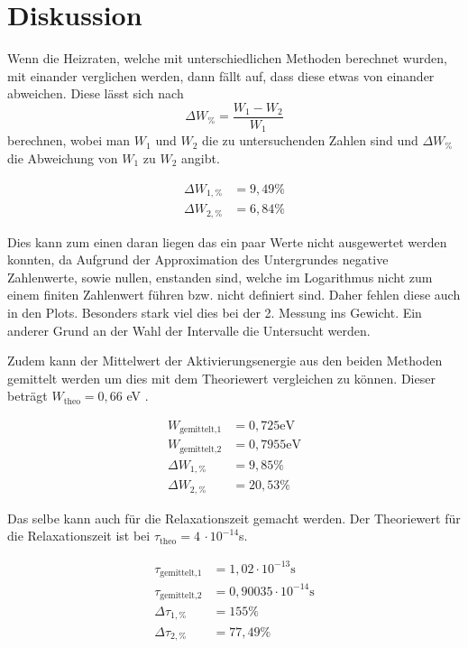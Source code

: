 \section{Diskussion}
\label{sec:Diskussion}

Wenn die Heizraten, welche mit unterschiedlichen Methoden berechnet wurden, mit einander verglichen werden, dann fällt auf, dass diese etwas von einander abweichen. Diese lässt sich 
nach 
\begin{equation*}
    \Delta W_{\%} = \frac{W_1-W_2}{W_1}
\end{equation*}
\noindent
berechnen, wobei man $W_1$ und $W_2$ die zu untersuchenden Zahlen sind und $\Delta W_{\%}$ die Abweichung von $W_1$ zu $W_2$ angibt.

\begin{align*}
    \Delta W_{1,\%} &=  9,49\%   \\
    \Delta W_{2,\%} &=  6,84\%
  \end{align*}

Dies kann zum einen daran liegen das ein paar Werte nicht ausgewertet werden konnten, da Aufgrund der Approximation des Untergrundes negative Zahlenwerte, sowie nullen, enstanden sind, welche
im Logarithmus nicht zum einem finiten Zahlenwert führen bzw. nicht definiert sind. Daher fehlen diese auch in den Plots. Besonders stark viel dies bei der 2. Messung ins Gewicht.
Ein anderer Grund an der Wahl der Intervalle die Untersucht werden.

\noindent
Zudem kann der Mittelwert der Aktivierungsenergie aus den beiden Methoden gemittelt werden um dies mit dem Theoriewert vergleichen zu können. Dieser beträgt $W_\text{theo} = 0,66$ eV \cite{muccillo}.

\begin{align*}
    W_\text{gemittelt,1} &= 0,725  \si{\electronvolt}\\
    W_\text{gemittelt,2} &= 0,7955 \si{\electronvolt}\\
    \Delta W_{1,\%} &=  9,85\%   \\
    \Delta W_{2,\%} &=  20,53\%
  \end{align*}

\noindent
Das selbe kann auch für die Relaxationszeit gemacht werden. Der Theoriewert für die Relaxationszeit ist bei $\tau_\text{theo} = 4 \, \cdot 10^{-14}$s. 

\begin{align*}
    \tau_\text{gemittelt,1} &= 1,02 \cdot 10^{-13} \si{\second}\\
    \tau_\text{gemittelt,2} &= 0,90035 \cdot 10^{-14} \si{\second}\\
    \Delta \tau_{1,\%} &=  155\%   \\
    \Delta \tau_{2,\%} &=  77,49\% \\
\end{align*}

